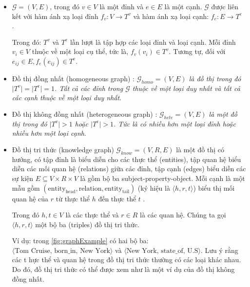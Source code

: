 \begin{itemize}
	\item \begin{definition}[Đồ thị]\label{def:defGraph}
		\(\mathcal{G} = (V, E)\), trong đó \(v \in V\) là một đỉnh và \(e \in E\) là một cạnh. \(\mathcal{G}\) được liên kết với hàm ánh xạ loại đỉnh \(f_v: V \to T^v\) và hàm ánh xạ loại cạnh: \(f_e: E \to T^e\) .
	\end{definition}
	
	Trong đó: \(T^v\) và \(T^e\) lần lượt là tập hợp các loại đỉnh và loại cạnh. Mỗi đỉnh \(v_i \in V\) thuộc về một loại cụ thể, tức là, \(f_v(v_i) \in T^v\). Tương tự, đối với \(e_{ij} \in E, f_e (e_{ij}) \in T^e\).
	
	\item
	\begin{definition}\label{def:homogeneous}
		Đồ thị đồng nhất (homogeneous graph) : \textit{ $\mathcal{G}_{homo} = (V, E)$ là đồ thị trong đó $\mid T^v \mid = \mid T^e \mid = 1$. Tất cả các đỉnh trong $\mathcal{G}$ thuộc về một loại duy nhất và tất cả các cạnh thuộc về một loại duy nhất}.
	\end{definition}
	
	\item
	\begin{definition}\label{def:heterogeneous}
		Đồ thị không đồng nhất (heterogeneous graph) : \textit{$\mathcal{G}_{hete} = (V, E)$ là một đồ thị trong đó $\mid T^v \mid > 1$ hoặc $\mid T^e \mid > 1$. Tức là có nhiều hơn một loại đỉnh hoặc nhiều hơn một loại cạnh}.
	\end{definition}
	
	\item
	\begin{definition}\label{def:knowledgeGraph}
		Đồ thị tri thức (knowledge graph)
		$\mathcal{G}_{know} = (V, R, E)$ là một đồ thị có hướng, có tập đỉnh là biểu diễn cho các thực thể (entities), tập quan hệ biểu diễn các mối quan hệ (relations) giữa các đỉnh, tập cạnh (edges) biểu diễn các sự kiện $E \subseteq V\times R \times V$ là gồm bộ ba subject-property-object. Mỗi cạnh là một mẫu gồm $(\text{entity}_{\text{head}}, \text{relation}, \text{entity}_{\text{tail}})$ (ký hiệu là $\langle h, r, t \rangle$) biểu thị mối quan hệ của $r$ từ thực thể $h$ đến thực thể $t$ .
	\end{definition}
	Trong đó $h, t \in V$ là các thực thể và $r \in R$ là các quan hệ. Chúng ta gọi $\langle h, r, t \rangle$ một bộ ba (triples) đồ thị tri thức.
	
	Ví dụ: trong \autoref{fig:graphExample} có hai bộ ba: 
	$\langle \text{Tom Cruise, born\_in, New York} \rangle$
và $\langle \text{New York, state\_of, U.S} \rangle$. Lưu ý rằng các t
hực thể và quan hệ trong đồ thị tri thức thường có các loại khác nhau. Do đó, đồ thị tri thức có thể được xem như là một ví dụ của đồ thị không đồng nhất.
\end{itemize}


